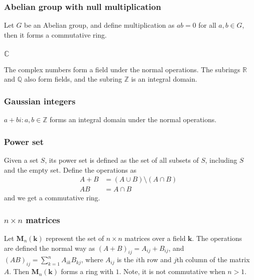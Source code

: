 \documentclass{article}
\theoremstyle{definition}
\begin{document}
  \subsubsection{Abelian group with null multiplication}
  Let $G$ be an Abelian group, and define multiplication as $ab = 0$ for all $a, b \in G$,
  then it forms a commutative ring.

  \subsubsection{$\mathbb{C}$}
  The complex numbers form a field under the normal operations. The subrings
  $\mathbb{R}$ and $\mathbb{Q}$ also form fields, and the subring $\mathbb{Z}$
  is an integral domain.

  \subsubsection{Gaussian integers}
  ${a + bi : a, b \in \mathbb{Z}}$ forms an integral domain under the normal operations.

  \subsubsection{Power set}
  Given a set $S$, its power set is defined as the set of all subsets of $S$,
  including $S$ and the empty set. Define the operations as
  \begin{align*}
    A + B &= (A \cup B) \setminus (A \cap B)\\
    AB &= A \cap B
  \end{align*}
  and we get a commutative ring.

  \subsubsection{$n \times n$ matrices}
  Let $\mathbf{M}_{n}(\mathbf{k})$ represent the set of $n \times n$ matrices
  over a field $\mathbf{k}$. The operations are defined the normal way as
  $(A + B)_{ij} = A_{ij} + B_{ij}$, and $(AB)_{ij} = \sum_{k=1}^{n} A_{ik} B_{kj}$,
  where $A_{ij}$ is the $i$th row and $j$th column of the matrix $A$. Then
  $\mathbf{M}_{n}(\mathbf{k})$ forms a ring with $1$. Note, it is not commutative
  when $n > 1$.


\end{document}
